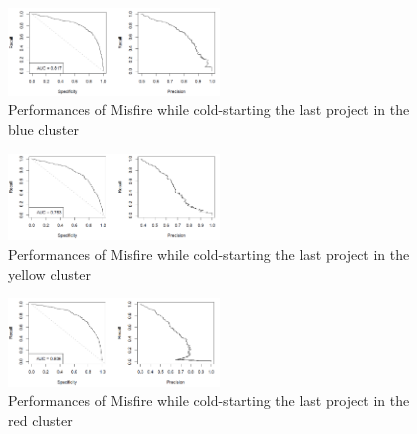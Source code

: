 \begin{figure}
  \centering
    \includegraphics[width=0.5\textwidth]{media/bluecluster.png}
    \caption{Performances of Misfire while cold-starting the last project in the blue cluster\label{fig:bluecluster}}
\end{figure}

\begin{figure}
  \centering
    \includegraphics[width=0.5\textwidth]{media/yellowcluster.png}
    \caption{Performances of Misfire while cold-starting the last project in the yellow cluster\label{fig:yellowcluster}}
\end{figure}


\begin{figure}
  \centering
    \includegraphics[width=0.5\textwidth]{media/redcluster.png}
    \caption{Performances of Misfire while cold-starting the last project in the red cluster\label{fig:redcluster}}
\end{figure}